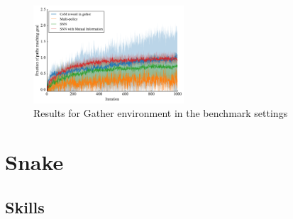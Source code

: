 \documentclass{article} %
\begin{document}
\begin{figure}[h!]
	\centering
	\label{fig:learn-gather-benchmark}
	\includegraphics[width = 0.5\textwidth]{Figures/learning-Gather.pdf}
	\caption{Results for Gather environment in the benchmark settings}
\end{figure}


\section{Snake}
\subsection{Skills}
\end{document}
